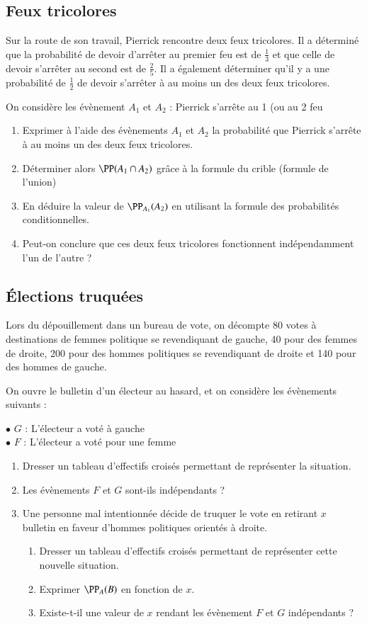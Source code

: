 \documentclass[oneside,12pt]{article}          %
\begin{document}
\subsection{Feux tricolores}
Sur la route de son travail, Pierrick rencontre deux feux tricolores. Il a déterminé que la probabilité de devoir d'arrêter au premier feu est de $\frac{1}{3}$ et que celle de devoir s'arrêter au second est de $\frac{2}{5}$. Il a également déterminer qu'il y a une probabilité de $\frac{1}{2}$ de devoir s'arrêter à au moins un des deux feux tricolores.

On considère les évènement $A_1$ et $A_2$ : \og Pierrick s'arrête au 1 (ou au 2 feu \fg
\begin{enumerate}
	\item Exprimer à l'aide des évènements $A_1$ et $A_2$ la probabilité que Pierrick s'arrête à au moins un des deux feux tricolores.
	\item Déterminer alors $\PP(A_1 \cap A_2)$ grâce à la formule du crible (formule de l'union)
	\item En déduire la valeur de $\PP_{A_1}(A_2)$ en utilisant la formule des probabilités conditionnelles.
	\item Peut-on conclure que ces deux feux tricolores fonctionnent indépendamment l'un de l'autre ?
\end{enumerate} 



\subsection{Élections truquées}
Lors du dépouillement dans un bureau de vote, on décompte 80 votes à destinations de femmes politique se revendiquant de gauche, 40 pour des femmes de droite, 200 pour des hommes politiques se revendiquant de droite et 140 pour des hommes de gauche.

On ouvre le bulletin d'un électeur au hasard, et on considère les évènements suivants :

$\bullet$ $G$ : \og L'électeur a voté à gauche \fg\ \\
$\bullet$ $F$ : \og L'électeur a voté pour une femme \fg\

\begin{enumerate}
	\item Dresser un tableau d'effectifs croisés permettant de représenter la situation.
	\item Les évènements $F$ et $G$ sont-ils indépendants ?
	\item Une personne mal intentionnée décide de truquer le vote en retirant $x$ bulletin en faveur d'hommes politiques orientés à droite.
	\begin{enumerate}
		\item Dresser un tableau d'effectifs croisés permettant de représenter cette nouvelle situation.
		\item Exprimer $\PP_A(B)$ en fonction de $x$.
		\item Existe-t-il une valeur de $x$ rendant les évènement $F$ et $G$ indépendants ?
	\end{enumerate}
\end{enumerate}
\end{document}
